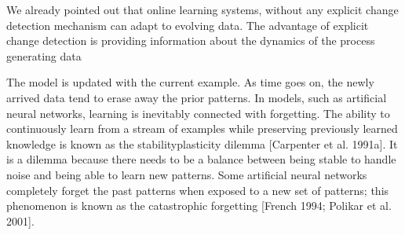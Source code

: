 We already pointed out that online learning systems, without any explicit change
detection mechanism can adapt to evolving data. The advantage of explicit change
detection is providing information about the dynamics of the process generating data

The model is
updated with the current example. As time goes on, the newly arrived data tend to
erase away the prior patterns. In models, such as artificial neural networks, learning
is inevitably connected with forgetting. The ability to continuously learn from a stream
of examples while preserving previously learned knowledge is known as the stabilityplasticity dilemma [Carpenter et al. 1991a]. It is a dilemma because there needs to be
a balance between being stable to handle noise and being able to learn new patterns.
Some artificial neural networks completely forget the past patterns when exposed to a
new set of patterns; this phenomenon is known as the catastrophic forgetting [French
1994; Polikar et al. 2001].